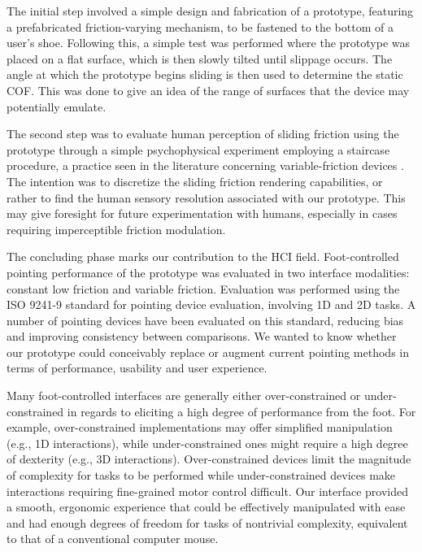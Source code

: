 \documentclass [12pt,letterpaper]{report}
\begin{document}
The initial step involved a simple design and fabrication of a prototype, featuring a prefabricated friction-varying mechanism, to be fastened to the bottom of a user's shoe. Following this, a simple test was performed where the prototype was placed on a flat surface, which is then slowly tilted until slippage occurs. The angle at which the prototype begins sliding is then used to determine the static COF. This was done to give an idea of the range of surfaces that the device may potentially emulate. 

The second step was to evaluate human perception of sliding friction using the prototype through a simple psychophysical experiment employing a staircase procedure, a practice seen in the literature concerning variable-friction devices \cite{samur2009psychophysical,bau2010teslatouch}. The intention was to discretize the sliding friction rendering capabilities, or rather to find the human sensory resolution associated with our prototype. This may give foresight for future experimentation with humans, especially in cases requiring imperceptible friction modulation.

The concluding phase marks our contribution to the HCI field. Foot-controlled pointing performance of the prototype was evaluated in two interface modalities: constant low friction and variable friction. Evaluation was performed using the ISO 9241-9 standard for pointing device evaluation, involving 1D and 2D tasks. A number of pointing devices have been evaluated on this standard, reducing bias and improving consistency between comparisons. We wanted to know whether our prototype could conceivably replace or augment current pointing methods in terms of performance, usability and user experience. 

Many foot-controlled interfaces are generally either over-constrained or under-constrained in regards to eliciting a high degree of performance from the foot. For example, over-constrained implementations may offer simplified manipulation (e.g., 1D interactions), while under-constrained ones might require a high degree of dexterity (e.g., 3D interactions). Over-constrained devices limit the magnitude of complexity for tasks to be performed while under-constrained devices make interactions requiring fine-grained motor control difficult. Our interface provided a smooth, ergonomic experience that could be effectively manipulated with ease and had enough degrees of freedom for tasks of nontrivial complexity, equivalent to that of a conventional computer mouse.
\end{document}
